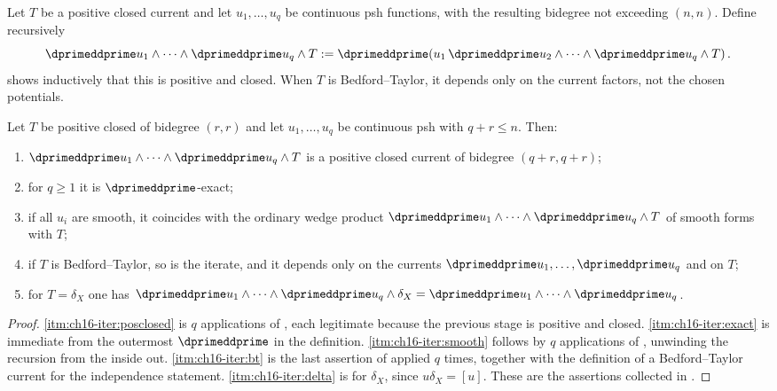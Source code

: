 Let $T$ be a positive closed current and let $u_1,\ldots,u_q$ be continuous
psh functions, with the resulting bidegree not exceeding $(n,n)$.  Define
recursively
\[
 \dprimeddprime u_1\wedge\cdots\wedge\dprimeddprime u_q\wedge T
 :=\dprimeddprime\!\left(
 u_1\,\dprimeddprime u_2\wedge\cdots\wedge
 \dprimeddprime u_q\wedge T\right).
\]
 shows inductively that this is positive and
closed.  When $T$ is Bedford--Taylor, it depends only on the current factors,
not the chosen potentials.

\begin{proposition}
\label{prop:ch16-iterate-basic}
Let $T$ be positive closed of bidegree $(r,r)$ and let $u_1,\ldots,u_q$ be
continuous psh with $q+r\leq n$.  Then:
\begin{enumerate}
\item\label{itm:ch16-iter:posclosed}
 $\dprimeddprime u_1\wedge\cdots\wedge\dprimeddprime u_q\wedge T$ is a
 positive closed current of bidegree $(q+r,q+r)$;
\item\label{itm:ch16-iter:exact}
 for $q\geq1$ it is $\dprimeddprime$-exact;
\item\label{itm:ch16-iter:smooth}
 if all $u_i$ are smooth, it coincides with the ordinary wedge product
 $\dprimeddprime u_1\wedge\cdots\wedge\dprimeddprime u_q\wedge T$ of smooth
 forms with $T$;
\item\label{itm:ch16-iter:bt}
 if $T$ is Bedford--Taylor, so is the iterate, and it depends only on the
 currents $\dprimeddprime u_1,\ldots,\dprimeddprime u_q$ and on $T$;
\item\label{itm:ch16-iter:delta}
 for $T=\delta_X$ one has
 $\dprimeddprime u_1\wedge\cdots\wedge\dprimeddprime u_q\wedge\delta_X
  =\dprimeddprime u_1\wedge\cdots\wedge\dprimeddprime u_q$.
\end{enumerate}
\end{proposition}

\begin{proof}
\cref{itm:ch16-iter:posclosed} is $q$ applications of
, each legitimate because the previous stage is
positive and closed.  \cref{itm:ch16-iter:exact} is immediate from the
outermost $\dprimeddprime$ in the definition.  \cref{itm:ch16-iter:smooth}
follows by $q$ applications of , unwinding the
recursion from the inside out.  \cref{itm:ch16-iter:bt} is the last assertion
of  applied $q$ times, together with the
definition of a Bedford--Taylor current for the independence statement.
\cref{itm:ch16-iter:delta} is  for
$\delta_X$, since $u\delta_X=[u]$.  These are the assertions collected in
\cite[\S8.7.1]{CLD25}.
\end{proof}

